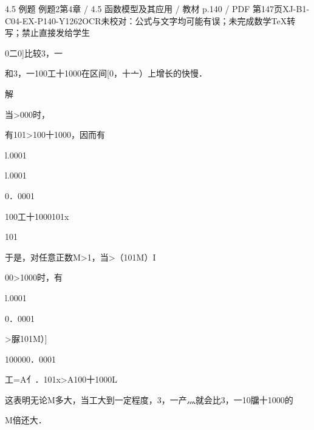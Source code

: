 \begin{bankitem}{4.5 例题 例题2}{第4章 / 4.5 函数模型及其应用 / 教材 p.140 / PDF 第147页}{XJ-B1-C04-EX-P140-Y1262}{OCR未校对：公式与文字均可能有误；未完成数学TeX转写；禁止直接发给学生}
\begin{ocrdraft}
\par
0二0]比较3，一
\par
和3，一100工十1000在区间[0，十亠）上增长的快慢．
\par
解
\par
当>000时，
\par
有101>100十1000，因而有
\par
l.0001
\par
l.0001
\par
0．0001
\par
100工十1000101x
\par
101
\par
于是，对任意正数M>1，当>（101M）I
\par
00>1000时，有
\par
l.0001
\par
0．0001
\par
>脲101M）]
\par
100000．0001
\par
工=A亻．101x>A100十1000L
\par
这表明无论M多大，当工大到一定程度，3，一产灬就会比3，一10牖十1000的
\par
M倍还大．
\end{ocrdraft}
\end{bankitem}
